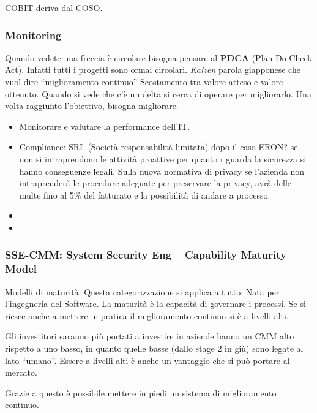COBIT deriva dal COSO.

\subsubsection{Monitoring} 
Quando vedete una freccia è circolare bisogna pensare al \textbf{PDCA} (Plan Do 
Check Act). Infatti tutti i progetti sono ormai circolari.  
\emph{Kaizen} parola giapponese che vuol dire ``miglioramento continuo''
Scostamento tra valore atteso e valore ottenuto. Quando si vede che c'è un delta 
 si cerca di operare per migliorarlo.
Una volta raggiunto l'obiettivo, bisogna migliorare.

\begin{itemize}
\item Monitorare e valutare la performance dell'IT.
\item Compliance:
SRL (Società responsabilità limitata) dopo il caso ERON? se non si intraprendono 
le attività proattive per quanto riguarda la sicurezza si hanno conseguenze 
legali.
Sulla nuova normativa di privacy se l'azienda non intraprenderà le procedure 
adeguate per preservare la privacy, avrà delle multe fino al 5\% del fatturato e 
la possibilità di andare a processo.
\item 
\item 
\end{itemize}

\subsubsection{SSE-CMM: System Security Eng -- Capability Maturity Model}
Modelli di maturità. Questa categorizzazione si applica a tutto. Nata per 
l'ingegneria del Software.
La maturità è la capacità di governare i processi. Se si riesce anche a mettere 
in pratica il miglioramento continuo si è a livelli alti.

Gli investitori saranno più portati a investire in aziende hanno un CMM alto 
rispetto a uno basso, in quanto quelle basse (dallo stage 2 in giù) sono legate 
al lato ``umano''. Essere a livelli alti è anche un vantaggio che si può portare 
al mercato.

Grazie a questo è possibile mettere in piedi un sistema di miglioramento 
continuo.

